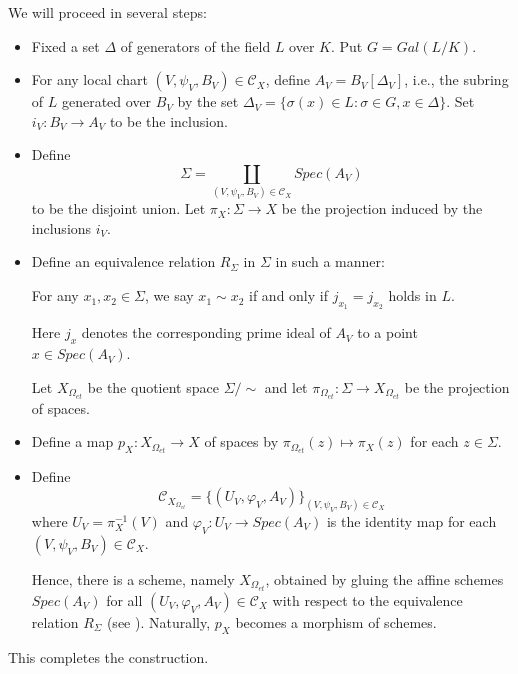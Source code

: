 \documentclass[12pt,twoside,reqno]{amsart}
\theoremstyle{definition}
\numberwithin{equation}{section}
\begin{document}
We will proceed in several steps:
\begin{itemize}
\item Fixed a set $\Delta $ of generators of the field $L$
over $K$. Put $G=Gal\left( L/K\right) .$

\item For any local chart $\left( V,\psi
_{V},B_{V}\right) \in \mathcal{C}_{X}$, define $A_{V}=B_{V}\left[ \Delta _{V}\right] $, i.e., the subring of $L$
generated over $B_{V}$ by the set
$
\Delta _{V}=\{\sigma \left( x\right) \in L:\sigma \in G,x\in \Delta \}.
$
Set $i_{V}:B_{V}\rightarrow A_{V}$ to be the inclusion.

\item Define
$$
\Sigma =\coprod\limits_{\left( V,\psi _{V},B_{V}\right) \in \mathcal{C}
_{X}}Spec\left( A_{V}\right)
$$
to be the disjoint union. Let $\pi _{X}:\Sigma \rightarrow X$ be the
projection induced by the inclusions $i_{V}$.

\item Define an equivalence relation $R_{\Sigma }$ in $
\Sigma $ in such a manner:

For any $x_{1},x_{2}\in \Sigma $, we say $x_{1}\sim x_{2}$ if and only if $
j_{x_{1}}=j_{x_{2}}$ holds in $L$.

Here $j_{x}$ denotes the corresponding
prime ideal of $A_{V}$ to a point $x\in Spec\left( A_{V}\right) $.

Let $ X_{\Omega _{et}}$ be the quotient space $\Sigma /\sim $ and let $\pi_{\Omega_{et}}:\Sigma \rightarrow  X_{\Omega _{et}}$ be the
projection of spaces.


\item Define a map $p_{X}:X_{\Omega_{et}}\rightarrow X$ of spaces  by
$
\pi_{\Omega_{et}}\left( z\right) \longmapsto \pi _{X}\left( z\right)
$
for each $z\in \Sigma $.

\item Define
\begin{equation*}
\mathcal{C}_{X_{\Omega_{et}}}=\{\left( U_{V},\varphi _{V},A_{V}\right) \}_{\left( V,\psi
_{V},B_{V}\right) \in \mathcal{C}_{X}}
\end{equation*}%
where $U_{V}=\pi _{X}^{-1}\left( V\right) $ and $\varphi
_{V}:U_{V}\rightarrow Spec(A_{V})$ is the identity map for each $\left(
V,\psi _{V},B_{V}\right) \in \mathcal{C}_{X}$.

Hence, there is a scheme, namely $X_{\Omega_{et}}$,
obtained by gluing the affine
schemes $Spec\left( A_{V}\right) $ for all $\left( U_{V},\varphi
_{V},A_{V}\right) \in \mathcal{C}_{X}$ with respect to the equivalence
relation $R_{\Sigma }$ (see \cite{EGA,Hrtsh}). Naturally, $p_{X}$ becomes a morphism of schemes.
\end{itemize}
This completes the construction.
\end{document}
